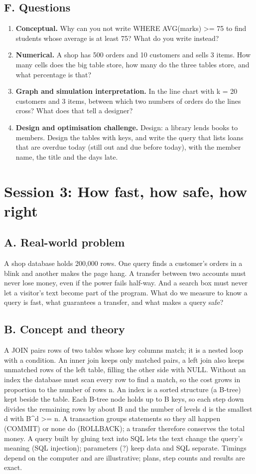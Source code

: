 \documentclass[11pt,a4paper]{article}
\begin{document}
\subsection*{F. Questions}
\begin{enumerate}[nosep]
\item \textbf{Conceptual.} Why can you not write WHERE AVG(marks) \textgreater{}= 75 to find students whose average is at least 75? What do you write instead?
\item \textbf{Numerical.} A shop has 500 orders and 10 customers and sells 3 items. How many cells does the big table store, how many do the three tables store, and what percentage is that?
\item \textbf{Graph and simulation interpretation.} In the line chart with k = 20 customers and 3 items, between which two numbers of orders do the lines cross? What does that tell a designer?
\item \textbf{Design and optimisation challenge.} Design: a library lends books to members. Design the tables with keys, and write the query that lists loans that are overdue today (still out and due before today), with the member name, the title and the days late.
\end{enumerate}

\section{Session 3: How fast, how safe, how right}

\subsection*{A. Real-world problem}
A shop database holds 200,000 rows. One query finds a customer's orders in a blink and another makes the page hang. A transfer between two accounts must never lose money, even if the power fails half-way. And a search box must never let a visitor's text become part of the program. What do we measure to know a query is fast, what guarantees a transfer, and what makes a query safe?

\subsection*{B. Concept and theory}
A JOIN pairs rows of two tables whose key columns match; it is a nested loop with a condition. An inner join keeps only matched pairs, a left join also keeps unmatched rows of the left table, filling the other side with NULL. Without an index the database must scan every row to find a match, so the cost grows in proportion to the number of rows n. An index is a sorted structure (a B-tree) kept beside the table. Each B-tree node holds up to B keys, so each step down divides the remaining rows by about B and the number of levels d is the smallest d with B\textasciicircum{}d \textgreater{}= n. A transaction groups statements so they all happen (COMMIT) or none do (ROLLBACK); a transfer therefore conserves the total money. A query built by gluing text into SQL lets the text change the query's meaning (SQL injection); parameters (?) keep data and SQL separate. Timings depend on the computer and are illustrative; plans, step counts and results are exact.
\end{document}
